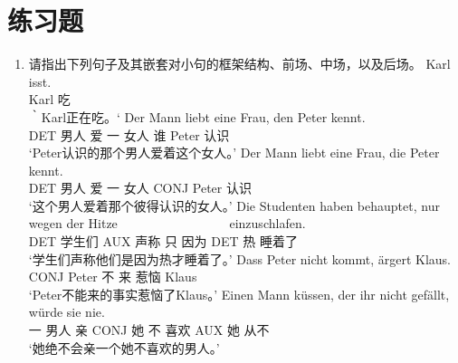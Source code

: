 %


\section*{练习题}
\begin{enumerate}
\item 请指出下列句子及其嵌套对小句的框架结构、前场、中场，以及后场。
\eal
\ex 
\gll Karl isst.\\
	 Karl 吃\\
\glt ｀Karl正在吃。‘
\ex 
\gll Der Mann liebt eine Frau, den Peter kennt.\\
     DET 男人  爱 一 女人 谁 Peter 认识\\
\glt `Peter认识的那个男人爱着这个女人。'
\ex 
\gll Der Mann liebt eine Frau, die Peter kennt.\\
	 DET 男人 爱 一 女人 CONJ Peter 认识\\
\glt `这个男人爱着那个彼得认识的女人。'
\ex 
\gll Die Studenten haben behauptet, nur wegen der Hitze~~~~~~~~~~~~~~~~~ einzuschlafen.\\
	 DET 学生们 AUX 声称 只 因为 DET 热 睡着了\\
\glt `学生们声称他们是因为热才睡着了。'
\ex 
\gll Dass Peter nicht kommt, ärgert Klaus.\\
	 CONJ Peter 不 来 惹恼 Klaus\\
\glt `Peter不能来的事实惹恼了Klaus。'
\ex 
\gll Einen Mann küssen, der ihr nicht gefällt, würde sie nie.\\
	 一 男人 亲 CONJ 她 不 喜欢 AUX 她 从不\\
\glt `她绝不会亲一个她不喜欢的男人。'
\zl
\end{enumerate}

